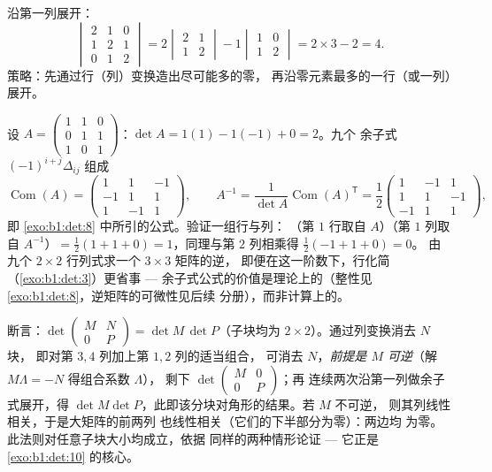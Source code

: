 \begin{example}\label{ex:b1:det:cofactor}
沿第一列展开：
\[
\begin{vmatrix}
2 & 1 & 0\\
1 & 2 & 1\\
0 & 1 & 2
\end{vmatrix}
= 2\begin{vmatrix} 2 & 1\\ 1 & 2\end{vmatrix}
- 1\begin{vmatrix} 1 & 0\\ 1 & 2\end{vmatrix}
= 2 \times 3 - 2 = 4 .
\]
策略：先通过行（列）变换造出尽可能多的零，
再沿零元素最多的一行（或一列）展开。
\end{example}

\begin{example}[手算一次余子式求逆]
\label{ex:b1:det:cofactorinverse}
设 $A = \begin{pmatrix} 1 & 1 & 0\\ 0 & 1 & 1\\ 1 & 0 &
1\end{pmatrix}$：$\det A = 1(1) - 1(-1) + 0 = 2$。九个
余子式 $(-1)^{i+j}\Delta_{ij}$ 组成
\[
\operatorname{Com}(A) = \begin{pmatrix}
1 & 1 & -1\\
-1 & 1 & 1\\
1 & -1 & 1
\end{pmatrix},
\qquad
A^{-1} = \frac{1}{\det A}\operatorname{Com}(A)^{\mathsf T}
= \frac12\begin{pmatrix}
1 & -1 & 1\\
1 & 1 & -1\\
-1 & 1 & 1
\end{pmatrix},
\]
即 \cref{exo:b1:det:8} 中所引的公式。验证一组行与列：
（第 $1$ 行取自 $A$）（第 $1$ 列取自 $A^{-1}$）$= \frac12(1 + 1
+ 0) = 1$，同理与第 $2$ 列相乘得 $\frac12(-1 + 1 + 0) = 0$。
由九个 $2\times2$ 行列式求一个 $3\times3$ 矩阵的逆，
即便在这一阶数下，行化简（\cref{exo:b1:det:3}）更省事 ---
余子式公式的价值是理论上的（整性见
\cref{exo:b1:det:8}，逆矩阵的可微性见后续
分册），而非计算上的。
\end{example}

\begin{example}[分块三角法则（$4$ 阶）]
\label{ex:b1:det:blocktriangular}
断言：$\det\begin{pmatrix} M & N\\ 0 & P\end{pmatrix} = \det
M\,\det P$（子块均为 $2\times2$）。通过列变换消去 $N$ 块，
即对第 $3, 4$ 列加上第 $1, 2$ 列的适当组合，
可消去 $N$，\emph{前提是 $M$ 可逆}（解
$M\Lambda = -N$ 得组合系数 $\Lambda$），
剩下 $\det\begin{pmatrix} M & 0\\ 0 & P\end{pmatrix}$；再
连续两次沿第一列做余子式展开，得 $\det
M\det P$，此即该分块对角形的结果。若 $M$ 不可逆，
则其列线性相关，于是大矩阵的前两列
也线性相关（它们的下半部分为零）：两边均
为零。此法则对任意子块大小均成立，依据
同样的两种情形论证 --- 它正是
\cref{exo:b1:det:10} 的核心。
\end{example}

